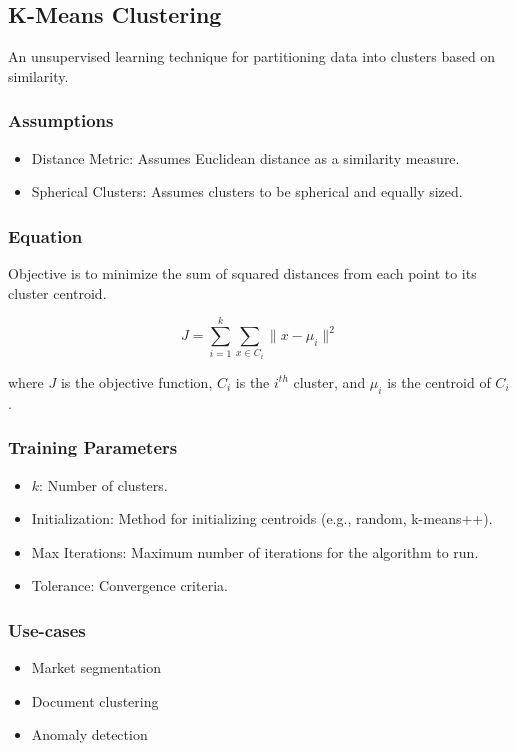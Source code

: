 \documentclass[english, threecolumn]{latex4ei/latex4ei_sheet}
\begin{document}
\begin{sectionbox}
\subsection{K-Means Clustering}
An unsupervised learning technique for partitioning data into clusters based on similarity.

\subsubsection{Assumptions}
\begin{itemize}
    \item Distance Metric: Assumes Euclidean distance as a similarity measure.
    \item Spherical Clusters: Assumes clusters to be spherical and equally sized.
\end{itemize}

\subsubsection{Equation}
Objective is to minimize the sum of squared distances from each point to its cluster centroid.

\[
J = \sum_{i=1}^{k} \sum_{x \in C_i} \|x - \mu_i\|^2
\]

where \(J\) is the objective function, \(C_i\) is the \(i^{th}\) cluster, and \(\mu_i\) is the centroid of \(C_i\).

\subsubsection{Training Parameters}
\begin{itemize}
    \item \( k \): Number of clusters.
    \item Initialization: Method for initializing centroids (e.g., random, k-means++).
    \item Max Iterations: Maximum number of iterations for the algorithm to run.
    \item Tolerance: Convergence criteria.
\end{itemize}

\subsubsection{Use-cases}
\begin{itemize}
    \item Market segmentation
    \item Document clustering
    \item Anomaly detection
\end{itemize}


\end{sectionbox}
\end{document}
